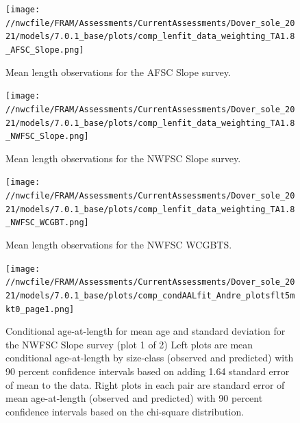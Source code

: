 \documentclass[11pt,
  english,
  a4paper,
]{article}
\begin{document}
\begin{figure}
\centering
\texttt{[image: //nwcfile/FRAM/Assessments/CurrentAssessments/Dover\_sole\_2021/models/7.0.1\_base/plots/comp\_lenfit\_data\_weighting\_TA1.8\_AFSC\_Slope.png]}
\caption{Mean length observations for the AFSC Slope survey.\label{fig:afsc-mean-len}}
\end{figure}

\tagmcend\tagstructend


\begin{figure}
\centering
\texttt{[image: //nwcfile/FRAM/Assessments/CurrentAssessments/Dover\_sole\_2021/models/7.0.1\_base/plots/comp\_lenfit\_data\_weighting\_TA1.8\_NWFSC\_Slope.png]}
\caption{Mean length observations for the NWFSC Slope survey.\label{fig:nwslope-mean-len}}
\end{figure}

\tagmcend\tagstructend


\begin{figure}
\centering
\texttt{[image: //nwcfile/FRAM/Assessments/CurrentAssessments/Dover\_sole\_2021/models/7.0.1\_base/plots/comp\_lenfit\_data\_weighting\_TA1.8\_NWFSC\_WCGBT.png]}
\caption{Mean length observations for the NWFSC WCGBTS.\label{fig:wcgbt-mean-len}}
\end{figure}

\tagmcend\tagstructend


\begin{figure}
\centering
\texttt{[image: //nwcfile/FRAM/Assessments/CurrentAssessments/Dover\_sole\_2021/models/7.0.1\_base/plots/comp\_condAALfit\_Andre\_plotsflt5mkt0\_page1.png]}
\caption{Conditional age-at-length for mean age and standard deviation for the NWFSC Slope survey (plot 1 of 2) Left plots are mean conditional age-at-length by size-class (observed and predicted) with 90 percent confidence intervals based on adding 1.64 standard error of mean to the data. Right plots in each pair are standard error of mean age-at-length (observed and predicted) with 90 percent confidence intervals based on the chi-square distribution.\label{fig:nwslope-caal-fit-1}}
\end{figure}
\end{document}
